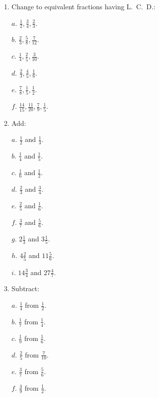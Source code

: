 \documentclass{book}
\begin{document}
\begin{enumerate}
$a$. $\frac{12}{6}$.

$b$. $\frac{15}{8}$.

$c$. $\frac{17}{4}$.

$d$. $\frac{84}{12}$.

$e$. $\frac{57}{8}$.

$f$. $\frac{61}{5}$.

$g$. $\frac{125}{6}$.

$h$. $\frac{97}{11}$.

$i$. $\frac{225}{7}$.

\item Change to equivalent fractions having L.~C.~D.:

$a$. $\frac{1}{2}, \frac{3}{4}, \frac{2}{3}$.

$b$. $\frac{2}{3}, \frac{5}{8}, \frac{7}{12}$.

$c$. $\frac{1}{4}, \frac{2}{5}, \frac{3}{10}$.

$d$. $\frac{2}{3}, \frac{4}{5}, \frac{1}{6}$.

$e$. $\frac{7}{8}, \frac{1}{5}, \frac{1}{2}$.

$f$. $\frac{14}{15}, \frac{11}{20}, \frac{7}{9}, \frac{1}{5}$.

\item Add:

$a$. $\frac{1}{2}$ and $\frac{1}{3}$.

$b$. $\frac{1}{4}$ and $\frac{1}{5}$.

$c$. $\frac{1}{6}$ and $\frac{1}{2}$.

$d$. $\frac{2}{3}$ and $\frac{3}{4}$.

$e$. $\frac{2}{5}$ and $\frac{1}{6}$.

$f$. $\frac{3}{7}$ and $\frac{5}{6}$.

$g$. $2\frac{1}{3}$ and $3\frac{1}{5}$.

$h$. $4\frac{2}{5}$ and $11\frac{5}{6}$.

$i$. $14\frac{3}{4}$ and $27\frac{4}{7}$.

\item Subtract:

$a$. $\frac{1}{4}$ from $\frac{1}{2}$.

$b$. $\frac{1}{7}$ from $\frac{1}{4}$.

$c$. $\frac{1}{9}$ from $\frac{1}{6}$.

$d$. $\frac{2}{5}$ from $\frac{7}{10}$.

$e$. $\frac{3}{7}$ from $\frac{5}{6}$.

$f$. $\frac{4}{9}$ from $\frac{1}{2}$.


\end{enumerate}
\end{document}
